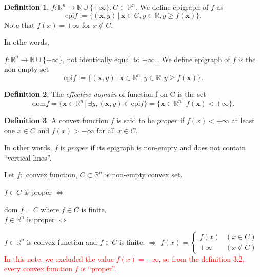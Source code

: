 \documentclass{jsarticle}
\theoremstyle{definition}
\newtheorem{dfn}{Definition}[section]
\begin{document}
\begin{dfn}
$f: \mathbb{R}^n \to \mathbb{R} \cup \{ +\infty\},  C \subset \mathbb{R}^n $. We define epigraph of $f$ as
\[
\text{epi} f := \{(\bm{x},  y) \, | \, \bm{x} \in C,  y \in \mathbb{R},  y \ge f(\bm{x}) \}.
\]
Note that $f(x) = +\infty$ for $x \notin C$.

In othe words, 

$f: \mathbb{R}^n \to \mathbb{R} \cup \{ +\infty\}$, not identically equal to $+ \infty$ .  We define epigraph of $f$ is the non-empty set 
\[
\text{epi} f := \{(\bm{x},  y) \, | \, \bm{x} \in \mathbb{R}^n,  y \in \mathbb{R},  y \ge f(\bm{x}) \}.
\]

\end{dfn}



\begin{dfn}
The \textit{effective domain} of function f on C is the set
\[
\text{dom} f = \{\bm{x} \in \mathbb{R}^n \, | \,  \exists y,  (\bm{x}, y) \in \text{epi} f \} = \{ \bm{x} \in \mathbb{R}^n \, | \, f(\bm{x}) < + \infty \}.
\]
\end{dfn}


\begin{dfn}
A convex function $f$ is said to be $proper$ if 
$f(x) < +\infty$ at least one $x \in C$ and $f(x) > - \infty$ for all $x \in C$.

In other words,  $f$ is $proper$ if its epigraph is non-empty and does not contain ``vertical lines''.
\end{dfn}

Let $f: $ convex function, $C \subset \mathbb{R}^n$ is non-empty convex set.

$f \in C$ is proper
$\Leftrightarrow$ 
 
dom $f = C$ where $f \in C$ is finite. \\
 
 
 $f \in \mathbb{R}^n$ is proper
$\Leftrightarrow$ 

 $f \in \mathbb{R}^n$ is convex function and $f \in C$ is finite. $ \Rightarrow$ 
 $f(x) = 
\begin{cases}
f(x) & (x \in C)\\
+ \infty & (x \notin C)
\end{cases}
$\\

\textcolor{red}{In this note,  we excluded the value $f(x) = - \infty$, so from the definition 3.2,  every convex function $f$ is ``proper''.}
\end{document}
